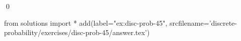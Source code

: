 
\begin{ex} 
  \label{ex:disc-prob-45}
  
  \qed
\end{ex} 
\begin{python0}
from solutions import *
add(label="ex:disc-prob-45",
    srcfilename='discrete-probability/exercises/disc-prob-45/answer.tex') 
\end{python0}
